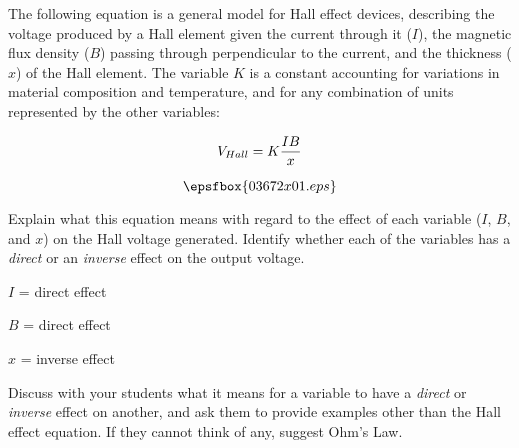 

The following equation is a general model for Hall effect devices, describing the voltage produced by a Hall element given the current through it ($I$), the magnetic flux density ($B$) passing through perpendicular to the current, and the thickness ($x$) of the Hall element.  The variable $K$ is a constant accounting for variations in material composition and temperature, and for any combination of units represented by the other variables:

$$V_{Hall} = K {IB \over x}$$

$$\epsfbox{03672x01.eps}$$

Explain what this equation means with regard to the effect of each variable ($I$, $B$, and $x$) on the Hall voltage generated.  Identify whether each of the variables has a {\it direct} or an {\it inverse} effect on the output voltage.







$I$ = direct effect

$B$ = direct effect

$x$ = inverse effect







Discuss with your students what it means for a variable to have a {\it direct} or {\it inverse} effect on another, and ask them to provide examples other than the Hall effect equation.  If they cannot think of any, suggest Ohm's Law.




